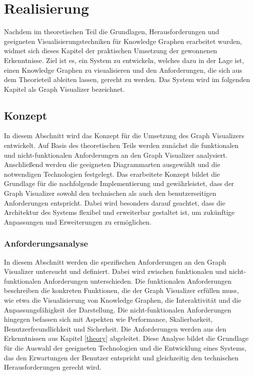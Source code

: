 
\chapter{Realisierung}

Nachdem im theoretischen Teil die Grundlagen, Herausforderungen und geeigneten Visualisierungstechniken für Knowledge Graphen erarbeitet wurden, widmet sich dieses Kapitel der praktischen Umsetzung der gewonnenen Erkenntnisse. Ziel ist es, ein System zu entwickeln, welches dazu in der Lage ist, einen Knowledge Graphen zu visualisieren und den Anforderungen, die sich aus dem Theorieteil ableiten lassen, gerecht zu werden. Das System wird im folgenden Kapitel als Graph Visualizer bezeichnet.

\section{Konzept}

In diesem Abschnitt wird das Konzept für die Umsetzung des Graph Visualizers entwickelt. Auf Basis des theoretischen Teils werden zunächst die funktionalen und nicht-funktionalen Anforderungen an den Graph Visualizer analysiert. Anschließend werden die geeigneten Diagrammarten ausgewählt und die notwendigen Technologien festgelegt. Das erarbeitete Konzept bildet die Grundlage für die nachfolgende Implementierung und gewährleistet, dass der Graph Visualizer sowohl den technischen als auch den benutzerseitigen Anforderungen entspricht. Dabei wird besonders darauf geachtet, dass die Architektur des Systems flexibel und erweiterbar gestaltet ist, um zukünftige Anpassungen und Erweiterungen zu ermöglichen.

\subsection{Anforderungsanalyse}
\label{realization:requirements}

In diesem Abschnitt werden die spezifischen Anforderungen an den Graph Visualizer untersucht und definiert. Dabei wird zwischen funktionalen und nicht-funktionalen Anforderungen unterschieden. Die funktionalen Anforderungen beschreiben die konkreten Funktionen, die der Graph Visualizer erfüllen muss, wie etwa die Visualisierung von Knowledge Graphen, die Interaktivität und die Anpassungsfähigkeit der Darstellung. Die nicht-funktionalen Anforderungen hingegen befassen sich mit Aspekten wie Performance, Skalierbarkeit, Benutzerfreundlichkeit und Sicherheit. Die Anforderungen werden aus den Erkenntnissen aus Kapitel \ref{theory} abgeleitet. Diese Analyse bildet die Grundlage für die Auswahl der geeigneten Technologien und die Entwicklung eines Systems, das den Erwartungen der Benutzer entspricht und gleichzeitig den technischen Herausforderungen gerecht wird.

